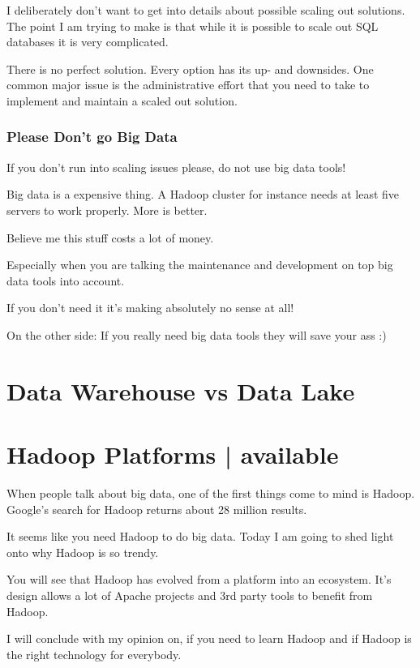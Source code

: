 \documentclass[12pt, numbers=noenddot]{scrreprt} %
\begin{document}
I deliberately don’t want to get into details about possible scaling out solutions. The point I am trying to make is that while it is possible to scale out SQL databases it is very complicated.

There is no perfect solution. Every option has its up- and downsides. One common major issue is the administrative effort that you need to take to implement and maintain a scaled out solution.

\subsection{Please Don’t go Big Data}

If you don’t run into scaling issues please, do not use big data tools!

Big data is a expensive thing. A Hadoop cluster for instance needs at least five servers to work properly. More is better.

Believe me this stuff costs a lot of money.

Especially when you are talking the maintenance and development on top big data tools into account.

If you don’t need it it’s making absolutely no sense at all!

On the other side: If you really need big data tools they will save your ass :)



\chapter{Data Warehouse vs Data Lake}

\chapter{Hadoop Platforms | available}
When people talk about big data, one of the first things come to mind is Hadoop. Google’s search for Hadoop returns about 28 million results.

It seems like you need Hadoop to do big data. Today I am going to shed light onto why Hadoop is so trendy.

You will see that Hadoop has evolved from a platform into an ecosystem. It’s design allows a lot of Apache projects and 3rd party tools to benefit from Hadoop.

I will conclude with my opinion on, if you need to learn Hadoop and if Hadoop is the right technology for everybody.
\end{document}
